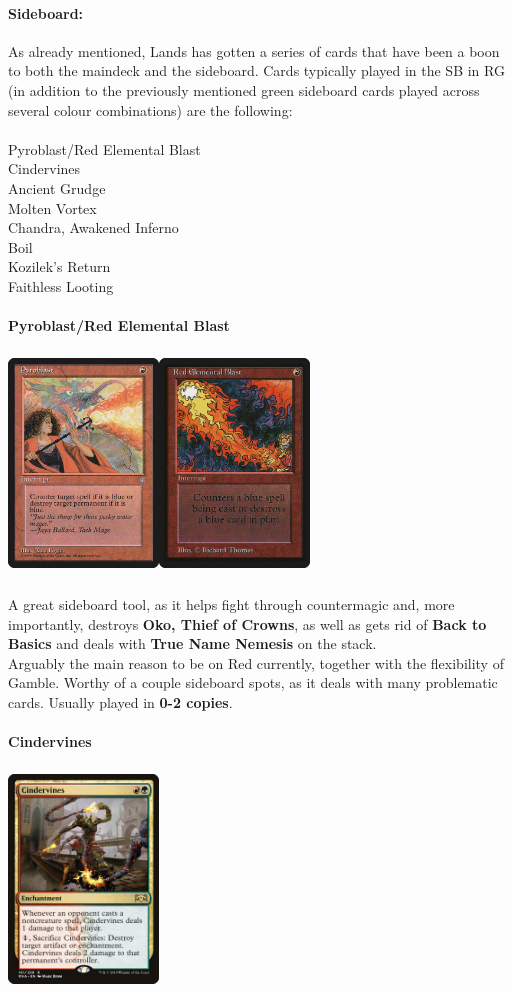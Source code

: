 \documentclass{report}
\begin{document}
\paragraph{Sideboard:\\}
As already mentioned, Lands has gotten a series of cards that have been a boon to both the maindeck and the sideboard.
Cards typically played in the SB in RG (in addition to the previously mentioned green sideboard cards played across several colour combinations) are the following:\\\\
Pyroblast/Red Elemental Blast\\
Cindervines\\
Ancient Grudge\\
Molten Vortex\\
Chandra, Awakened Inferno\\
Boil\\
Kozilek's Return\\
Faithless Looting\\\\
\textbf{Pyroblast/Red Elemental Blast\\}
\begin{center}
\includegraphics [width = 8cm, height = 6cm] {pyroblast-reb}
\end{center}
A great sideboard tool, as it helps fight through countermagic and, more importantly, destroys \textbf{Oko, Thief of Crowns}, as well as gets rid of \textbf{Back to Basics} and deals with \textbf{True Name Nemesis} on the stack.\\Arguably the main reason to be on Red currently, together with the flexibility of Gamble. Worthy of a couple sideboard spots, as it deals with many problematic cards. Usually played in \textbf{0-2 copies}.\\\\
\textbf{Cindervines\\}
\begin{center}
\includegraphics [width = 4cm, height = 6cm] {cindervines}
\end{center}
\end{document}
